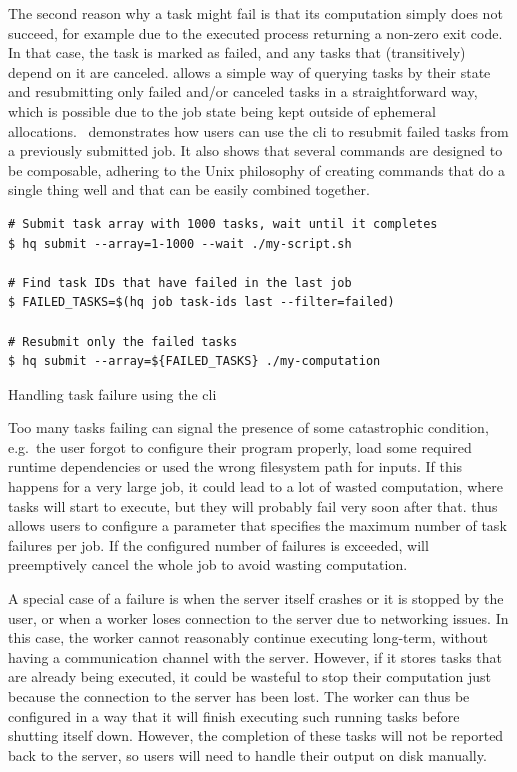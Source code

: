The second reason why a task might fail is that its computation simply does not succeed, for
example due to the executed process returning a non-zero exit code. In that case, the task is
marked as failed, and any tasks that (transitively) depend on it are canceled.
\hyperqueue{} allows a simple way of querying tasks by their state and resubmitting only
failed and/or canceled tasks in a straightforward way, which is possible due to the job state being
kept outside of ephemeral allocations.~ demonstrates how users can use the
\hq{} \gls{cli} to resubmit failed tasks from a previously
submitted job. It also shows that several \hq{} commands are designed to be
composable, adhering to the Unix philosophy of creating commands that do a single thing well and
that can be easily combined together.

\begin{listing}[h]
	\begin{verbatim}
# Submit task array with 1000 tasks, wait until it completes
$ hq submit --array=1-1000 --wait ./my-script.sh

# Find task IDs that have failed in the last job
$ FAILED_TASKS=$(hq job task-ids last --filter=failed)

# Resubmit only the failed tasks
$ hq submit --array=${FAILED_TASKS} ./my-computation
	\end{verbatim}
	\caption{Handling task failure using the \hyperqueue{} \gls{cli}}
	\label{lst:hq-cli-fault-tolerance}
\end{listing}

Too many tasks failing can signal the presence of some catastrophic condition, e.g.\ the user
forgot to configure their program properly, load some required runtime dependencies or used the
wrong filesystem path for inputs. If this happens for a very large job, it could lead to a lot of
wasted computation, where tasks will start to execute, but they will probably fail very soon after
that. \hyperqueue{} thus allows users to configure a parameter that specifies the maximum
number of task failures per job. If the configured number of failures is exceeded,
\hq{} will preemptively cancel the whole job to avoid wasting computation.

A special case of a failure is when the server itself crashes or it is stopped by the user, or when
a worker loses connection to the server due to networking issues. In this case, the worker cannot
reasonably continue executing long-term, without having a communication channel with the server.
However, if it stores tasks that are already being executed, it could be wasteful to stop their
computation just because the connection to the server has been lost. The worker can thus be
configured in a way that it will finish executing such running tasks before shutting itself down.
However, the completion of these tasks will not be reported back to the server, so users will need
to handle their output on disk manually.

